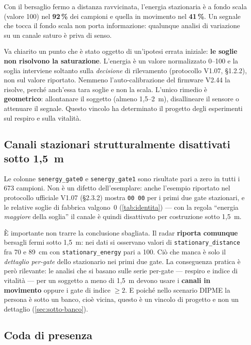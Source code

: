 Con il bersaglio fermo a distanza ravvicinata, l'energia stazionaria è a fondo
scala (valore 100) nel \textbf{92\,\%} dei campioni e quella in movimento nel
\textbf{41\,\%}. Un segnale che tocca il fondo scala non porta informazione:
qualunque analisi di variazione su un canale saturo è priva di senso.

Va chiarito un punto che è stato oggetto di un'ipotesi errata iniziale: \textbf{le
soglie non risolvono la saturazione}. L'energia è un valore normalizzato 0--100 e
la soglia interviene soltanto sulla \emph{decisione} di rilevamento (protocollo
V1.07, \S1.2.2), non sul valore riportato. Nemmeno l'auto-calibrazione del firmware
V2.44 la risolve, perché anch'essa tara soglie e non la scala. L'unico rimedio è
\textbf{geometrico}: allontanare il soggetto (almeno 1,5--2~m), disallineare il
sensore o attenuare il segnale. Questo vincolo ha determinato il progetto degli
esperimenti sul respiro e sulla vitalità.

\subsection{Canali stazionari strutturalmente disattivati sotto 1,5~m}
\label{sec:senergy-zero}

Le colonne \texttt{senergy\_gate0} e \texttt{senergy\_gate1} sono risultate pari a
zero in tutti i 673 campioni. Non è un difetto dell'esemplare: anche l'esempio
riportato nel protocollo ufficiale V1.07 (\S2.3.2) mostra \texttt{00 00} per i
primi due gate stazionari, e le relative soglie di fabbrica valgono~0
(\cref{tab:identita}) --- con la regola ``energia \emph{maggiore} della soglia'' il
canale è quindi disattivato per costruzione sotto 1,5~m.

È importante non trarre la conclusione sbagliata. Il radar \textbf{riporta comunque}
bersagli fermi sotto 1,5~m: nei dati si osservano valori di
\texttt{stationary\_distance} fra 70 e 89~cm con \texttt{stationary\_energy} pari a
100. Ciò che manca è solo il \emph{dettaglio per-gate} dello stazionario nei primi
due gate. La conseguenza pratica è però rilevante: le analisi che si basano sulle
serie per-gate --- respiro e indice di vitalità --- per un soggetto a meno di 1,5~m
devono usare i \textbf{canali in movimento} oppure i gate di indice $\geq 2$.
E poiché nello scenario DIPME la persona è sotto un banco, cioè vicina, questo è
un vincolo di progetto e non un dettaglio (\cref{sec:sotto-banco}).

\subsection{Coda di presenza}
\label{sec:coda}

